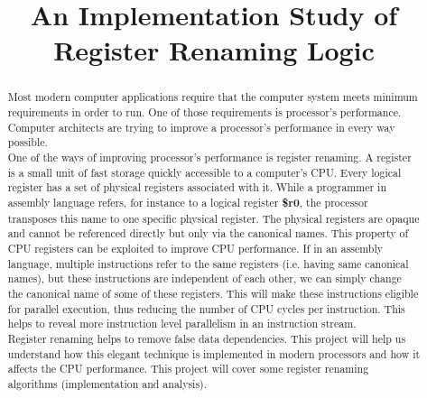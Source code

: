 \documentclass[12pt]{extreport}
\title{An Implementation Study of Register Renaming Logic}
\begin{document}


\begin{abstract}
Most modern computer applications require that the computer system meets minimum requirements in order to run. One of those requirements is processor’s performance. Computer architects are trying to improve a processor's performance in every way possible. \\
One of the ways of improving processor's performance is register renaming. A register is a small unit of fast storage quickly accessible to a computer's CPU. Every logical register has a set of physical registers associated with it. While a programmer in assembly language refers, for instance to a logical register \textbf{\$r0}, the processor transposes this name to one specific physical register. The physical registers are opaque and cannot be referenced directly but only via the canonical names. This property of CPU registers can be exploited to improve CPU performance. If in an assembly language, multiple instructions refer to the same registers (i.e. having same canonical names), but these instructions are independent of each other, we can simply change the canonical name of some of these registers. This will make these instructions eligible for parallel execution, thus reducing the number of CPU cycles per instruction. This helps to reveal more instruction level parallelism in an instruction stream. \\
Register renaming helps to remove false data dependencies. This project will help us understand how this elegant technique is implemented in modern processors and how it affects the CPU performance. This project will cover some register renaming algorithms (implementation and analysis).

\end{abstract}
\tableofcontents







\end{document}
